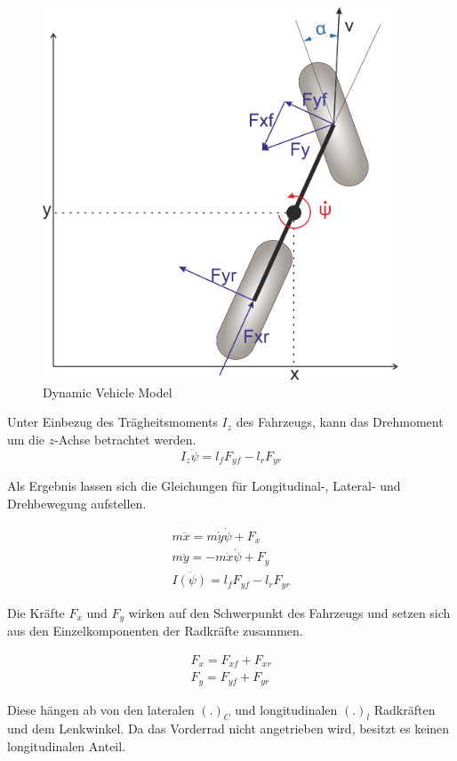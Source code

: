 \documentclass{like}
\begin{document}
\begin{figure}[hb!]
	\centering
	\includegraphics[width=300pt]{Abbildungen/dynBicycle.png}
	\caption{Dynamic Vehicle Model}
	\label{fig:dynModel}
\end{figure}




Unter Einbezug des Trägheitsmoments \(I_z\) des Fahrzeugs, kann das Drehmoment um die \(z\)-Achse betrachtet werden.
\begin{equation}
I_z \ddot{\psi} = l_f F_{yf} - l_r F_{yr}
\end{equation}

Als Ergebnis lassen sich die Gleichungen für Longitudinal-, Lateral- und Drehbewegung aufstellen.

\begin{eqnarray}
m \ddot{x} = m \dot{y} \dot{\psi} + F_x \\
m \ddot{y} = - m \dot{x} \dot{\psi} + F_y \\
I \ddot{(\psi)} = l_f F_{yf} - l_r F_{yr}
\end{eqnarray}

Die Kräfte \(F_{x}\) und \(F_{y}\) wirken auf den Schwerpunkt des Fahrzeugs und setzen sich aus den Einzelkomponenten der Radkräfte zusammen.

\begin{eqnarray}
F_x = F_{xf} + F_{xr} \\
F_y = F_{yf} + F_{yr}
\end{eqnarray}

Diese hängen ab von den lateralen \((.)_C\) und longitudinalen \((.)_l\)    Radkräften und dem Lenkwinkel. Da das Vorderrad nicht angetrieben wird, besitzt es keinen longitudinalen Anteil. 
\end{document}
